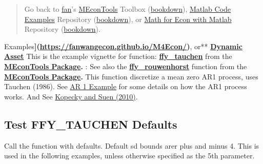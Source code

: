 \documentclass[
]{book}
\begin{document}
\begin{quote}
Go back to \href{http://fanwangecon.github.io/}{fan}'s \href{https://fanwangecon.github.io/MEconTools/}{MEconTools} Toolbox (\href{https://fanwangecon.github.io/MEconTools/bookdown}{bookdown}), \href{https://fanwangecon.github.io/M4Econ/}{Matlab Code Examples} Repository (\href{https://fanwangecon.github.io/M4Econ/bookdown}{bookdown}), or \href{https://fanwangecon.github.io/Math4Econ/}{Math for Econ with Matlab} Repository (\href{https://fanwangecon.github.io/Math4Econ/bookdown}{bookdown}).
\end{quote}

Examples\textbf{{]}(\url{https://fanwangecon.github.io/M4Econ/})}, or** \href{https://fanwangecon.github.io/CodeDynaAsset/}{\textbf{Dynamic
Asset}}
This is the example vignette for function:
\href{https://github.com/FanWangEcon/MEconTools/blob/master/MEconTools/external/stats/ffy_tauchen.m}{\textbf{ffy\_tauchen}}
from the \href{https://fanwangecon.github.io/MEconTools/}{\textbf{MEconTools
Package}}\textbf{.} : See also
the
\href{https://github.com/FanWangEcon/MEconTools/blob/master/MEconTools/external/stats/ffy_rouwenhorst.m}{\textbf{ffy\_rouwenhorst}}
function from the \href{https://fanwangecon.github.io/MEconTools/}{\textbf{MEconTools
Package}}\textbf{.} This function
discretize a mean zero AR1 process, uses Tauchen (1986). See \href{https://fanwangecon.github.io/M4Econ/panel/timeseries/htmlpdfm/fs_autoregressive.html}{AR 1
Example}
for some details on how the AR1 process works. And See \href{https://doi.org/10.1016/j.red.2010.02.002}{Kopecky and Suen
(2010)}.

\hypertarget{test-ffy_tauchen-defaults}{%
\subsection{Test FFY\_TAUCHEN Defaults}\label{test-ffy_tauchen-defaults}}

Call the function with defaults. Default sd bounds arer plus and minus
4. This is used in the following examples, unless otherwise specified as
the 5th parameter.
\end{document}
